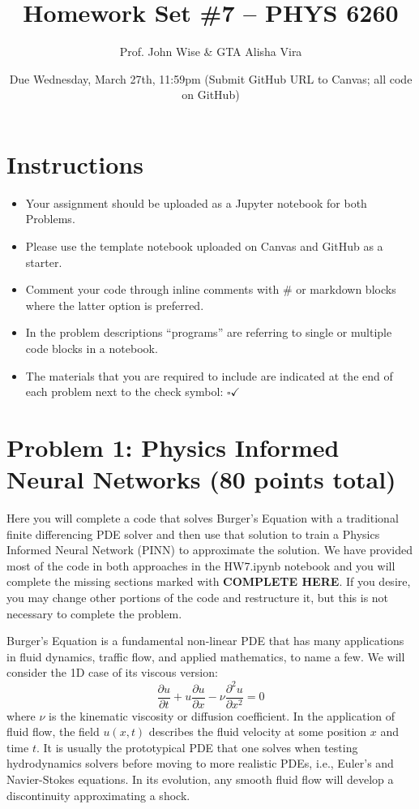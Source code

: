 \documentclass{article}
\begin{document}
\title{Homework Set \#7 – PHYS 6260}
\author{Prof. John Wise \& GTA Alisha Vira}
\date{Due Wednesday, March 27th, 11:59pm (Submit GitHub URL to Canvas; all code on GitHub)}
\maketitle

\section*{Instructions}
\begin{itemize}
    \item Your assignment should be uploaded as a Jupyter notebook for both Problems.
    \item Please use the template notebook uploaded on Canvas and GitHub as a starter.
    \item Comment your code through inline comments with \# or markdown blocks where the latter option is preferred.
    \item In the problem descriptions “programs” are referring to single or multiple code blocks in a notebook.
    \item The materials that you are required to include are indicated at the end of each problem next to the check symbol: $\square\checkmark$
\end{itemize}

\section*{Problem 1: Physics Informed Neural Networks (80 points total)}
Here you will complete a code that solves Burger’s Equation with a traditional finite differencing PDE solver and then use that solution to train a Physics Informed Neural Network (PINN) to approximate the solution. We have provided most of the code in both approaches in the HW7.ipynb notebook and you will complete the missing sections marked with \textbf{COMPLETE HERE}. If you desire, you may change other portions of the code and restructure it, but this is not necessary to complete the problem.

Burger’s Equation is a fundamental non-linear PDE that has many applications in fluid dynamics, traffic flow, and applied mathematics, to name a few. We will consider the 1D case of its viscous version:
\begin{equation}
    \frac{\partial u}{\partial t} + u \frac{\partial u}{\partial x} - \nu \frac{\partial^2 u}{\partial x^2} = 0 \tag{1}
\end{equation}
where $\nu$ is the kinematic viscosity or diffusion coefficient. In the application of fluid flow, the field $u(x, t)$ describes the fluid velocity at some position $x$ and time $t$. It is usually the prototypical PDE that one solves when testing hydrodynamics solvers before moving to more realistic PDEs, i.e., Euler’s and Navier-Stokes equations. In its evolution, any smooth fluid flow will develop a discontinuity approximating a shock.
\end{document}
